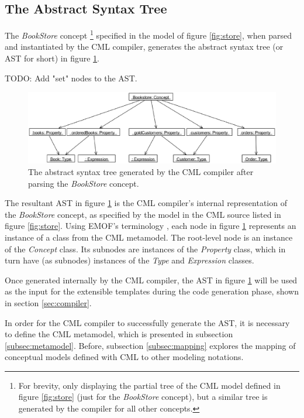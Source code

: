 \subsection{The Abstract Syntax Tree}\label{subsec:ast}

The \emph{BookStore} concept
\footnote{For brevity,
only displaying the partial tree of the CML model defined in figure \ref{fig:store} (just for the \emph{BookStore} concept), 
but a similar tree is generated by the compiler for all other concepts.}
specified in the model of figure \ref{fig:store},
when parsed and instantiated by the CML compiler,
generates the abstract syntax tree (or AST for short) in figure \ref{fig:ast}.

TODO: Add "set" nodes to the AST.

\begin{figure}
\centering
\includegraphics[width=\textwidth]{language/figure-ast}
\caption{The abstract syntax tree generated by the CML compiler after parsing the \emph{BookStore} concept.}
\label{fig:ast}
\end{figure}

The resultant AST in figure \ref{fig:ast} is the CML compiler's internal representation of the \emph{BookStore} concept,
as specified by the model in the CML source listed in figure \ref{fig:store}. 
Using EMOF's terminology \cite{mof},
each node in figure \ref{fig:ast} represents an instance of a class from the CML metamodel.
The root-level node is an instance of the \emph{Concept} class. 
Its subnodes are instances of the \emph{Property} class,
which in turn have (as subnodes) instances of the \emph{Type} and \emph{Expression} classes.

Once generated internally by the CML compiler,
the AST in figure \ref{fig:ast} will be used as the input for the extensible templates during the code generation phase,
shown in section \ref{sec:compiler}.

In order for the CML compiler to successfully generate the AST,
it is necessary to define the CML metamodel,
which is presented in subsection \ref{subsec:metamodel}.
Before, subsection \ref{subsec:mapping} explores the mapping of conceptual models defined with CML to other modeling notations.

